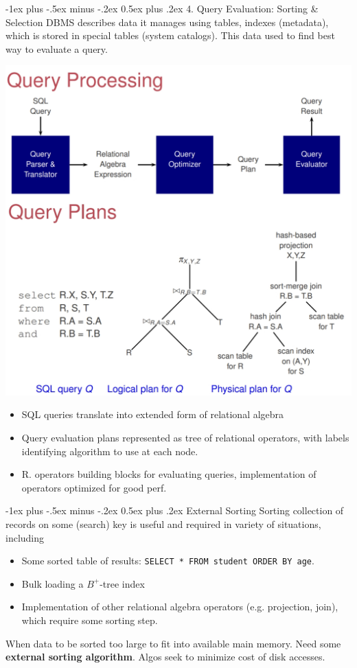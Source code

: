 \documentclass[10pt, landscape]{article}
\makeatletter
\renewcommand{\section}{\@startsection{section}{1}{0mm}%
                                {-1ex plus -.5ex minus -.2ex}%
                                {0.5ex plus .2ex}%
                                {\normalfont\large\bfseries}}
\newcommand{\code}[1]{\colorbox{gray!25!}{\lstinline|#1|}}
\makeatother
\begin{document}
\begin{multicols*}{3}
\section{4. Query Evaluation: Sorting \& Selection}
DBMS describes data it manages using tables, indexes (metadata), which is stored in special tables (system catalogs). This data used to find best way to evaluate a query.
\centerline{\includegraphics[width = 0.8\linewidth]{queryProcessing}}
\begin{itemize}
\item SQL queries translate into extended form of relational algebra
\item Query evaluation plans represented as tree of relational operators, with labels identifying algorithm to use at each node.
\item R. operators building blocks for evaluating queries, implementation of operators optimized for good perf.
\end{itemize}

\section{External Sorting}
Sorting collection of records on some (search) key is useful and required in variety of situations, including 
\begin{itemize}
\item Some sorted table of results: \code{SELECT * FROM student ORDER BY age}.
\item Bulk loading a $B^+$-tree index
\item Implementation of other relational algebra operators (e.g. projection, join), which require some sorting step.
\end{itemize}
When data to be sorted too large to fit into available main memory. Need some \textbf{external sorting algorithm}. Algos seek to minimize cost of disk accesses.


\end{multicols*}
\end{document}
